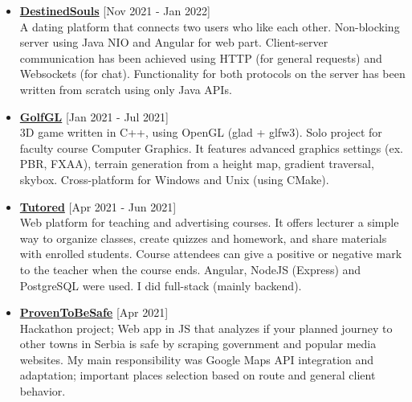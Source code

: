 \documentclass[a4paper]{moderncv}
\begin{document}
		\begin{itemize}

			\item \textbf{\href{https://github.com/MATF-Computer-Networks-Projects/2021_DestinedSouls}{DestinedSouls}} \hfill[Nov 2021 - Jan 2022]\\
			A dating platform that connects two users who like each other. Non-blocking server using Java NIO and Angular for 
			web part. Client-server communication has been achieved using HTTP (for general requests) and Websockets (for chat).
			Functionality for both protocols on the server has been written from scratch using only Java APIs.
						
			\item \textbf{\href{https://github.com/djordjetane/GolfGL}{GolfGL}} \hfill[Jan 2021 - Jul 2021]\\
			3D game written in C++, using OpenGL (glad + glfw3). Solo project for faculty course Computer Graphics. 
			It features advanced graphics settings (ex. PBR, FXAA), terrain generation from a height map, gradient traversal, skybox.
			Cross-platform for Windows and Unix (using CMake).

			\item \textbf{\href{https://gitlab.com/matfpveb/projekti/2020-2021/18-Tutored}{Tutored}} \hfill[Apr 2021 - Jun 2021]\\
			Web platform for teaching and advertising courses. It offers lecturer a simple way to organize classes, create quizzes and homework, and share materials with enrolled students.
			Course attendees can give a positive or negative mark to the teacher when the course ends. Angular, NodeJS (Express) and PostgreSQL were used. 
			I did full-stack (mainly backend).

			\item \textbf{\href{https://github.com/idakucamupeva/dokazano_bezbedno}{ProvenToBeSafe}} \hfill[Apr 2021]\\
			Hackathon project; Web app in JS that analyzes if your planned journey to other towns in Serbia is safe by scraping
			government and popular media websites. My main responsibility was Google Maps API integration and adaptation; 
			important places selection based on route and general client behavior.
		


\end{itemize}
\end{document}
